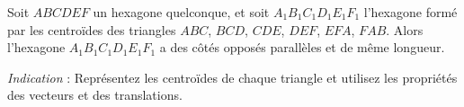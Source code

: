 Soit $ABCDEF$ un hexagone quelconque, et soit $A_1B_1C_1D_1E_1F_1$
l'hexagone formé par les centroïdes des triangles $ABC$, $BCD$, $CDE$,
$DEF$, $EFA$, $FAB$. Alors l'hexagone $A_1B_1C_1D_1E_1F_1$ a des côtés
opposés parallèles et de même longueur.

\emph{Indication} : Représentez les centroïdes de chaque triangle et utilisez
les propriétés des vecteurs et des translations.
